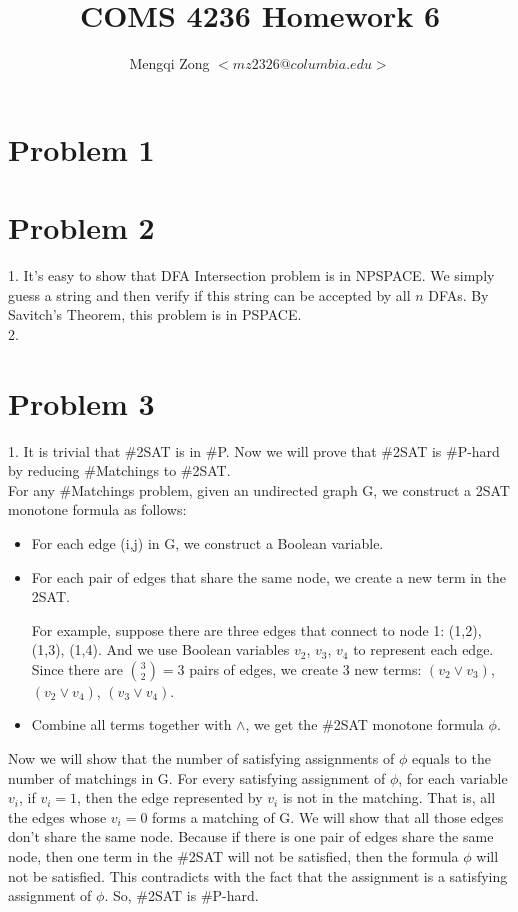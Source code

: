 \documentclass[12pt]{article}
\title{COMS 4236 Homework 6}
\author{Mengqi Zong $<mz2326@columbia.edu>$}
\begin{document}
\maketitle

\setlength{\parindent}{0in}

\section*{Problem 1}


\section*{Problem 2}

1. It's easy to show that DFA Intersection problem is in NPSPACE. We
simply guess a string and then verify if this string can be accepted
by all $n$ DFAs. By Savitch's Theorem, this problem is in PSPACE. \\

2. 

\section*{Problem 3}

1. It is trivial that \#2SAT is in \#P. Now we will prove that \#2SAT is
\#P-hard by reducing \#Matchings to \#2SAT. \\

For any \#Matchings problem, given an undirected graph G, we construct
a 2SAT monotone formula as follows:

\begin{itemize}
\item For each edge (i,j) in G, we construct a Boolean variable.
\item For each pair of edges that share the same node, we create a
  new term in the 2SAT.

  For example, suppose there are three edges that connect to node 1:
  (1,2), (1,3), (1,4). And we use Boolean variables $v_2$, $v_3$,
  $v_4$ to represent each edge. Since there are $\binom {3}{2} = 3$
  pairs of edges, we create 3 new terms: $(v_2 \lor v_3)$, $(v_2 \lor
  v_4)$, $(v_3 \lor v_4)$.
\item Combine all terms together with $\land$, we get the \#2SAT
  monotone formula $\phi$.
\end{itemize}

Now we will show that the number of satisfying assignments of $\phi$
equals to the number of matchings in G. For every satisfying
assignment of $\phi$, for each variable $v_i$, if $v_i = 1$, then the
edge represented by $v_i$ is not in the matching. That is, all the
edges whose $v_i = 0$ forms a matching of G. We will show that all
those edges don't share the same node. Because if there is one pair of
edges share the same node, then one term in the \#2SAT will not be
satisfied, then the formula $\phi$ will not be satisfied. This 
contradicts with the fact that the assignment is a satisfying
assignment of $\phi$. So, \#2SAT is \#P-hard. \\
\end{document}
